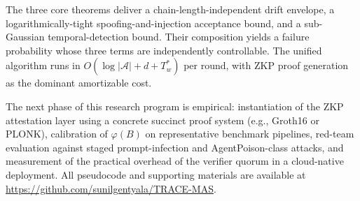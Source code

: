 \documentclass[conference]{IEEEtran}
\begin{document}
The three core theorems deliver a chain-length-independent drift
envelope, a logarithmically-tight spoofing-and-injection acceptance
bound, and a sub-Gaussian temporal-detection bound. Their composition
yields a failure probability whose three terms are independently
controllable. The unified algorithm runs in $O(\log|\mathcal{A}|
+ d + T_w^{*})$ per round, with ZKP proof generation as the dominant
amortizable cost.

The next phase of this research program is empirical: instantiation
of the ZKP attestation layer using a concrete succinct proof system
(e.g., Groth16 or PLONK), calibration of $\varphi(B)$ on
representative benchmark pipelines, red-team evaluation against staged
prompt-infection and AgentPoison-class attacks, and measurement of the
practical overhead of the verifier quorum in a cloud-native deployment.
All pseudocode and supporting materials are available at
\url{https://github.com/sunilgentyala/TRACE-MAS}.
\end{document}
